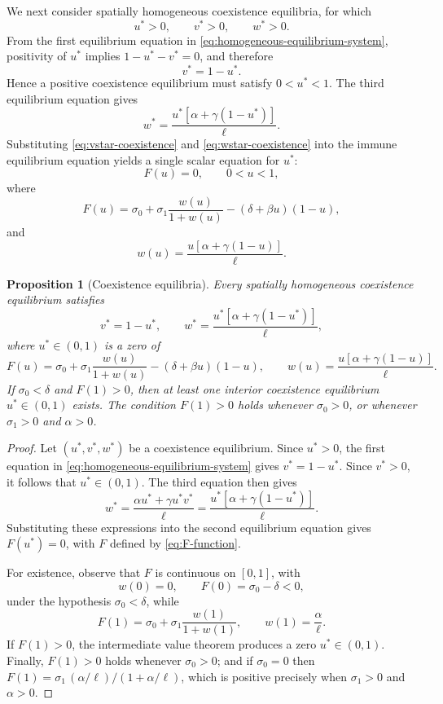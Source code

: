 \documentclass[a4paper,fleqn,longmktitle]{cas-sc}
\theoremstyle{plain}
\newtheorem{proposition}[theorem]{Proposition}
\theoremstyle{definition}
\numberwithin{equation}{section}
\begin{document}
We next consider spatially homogeneous coexistence equilibria, for which
\[
u^*>0,\qquad v^*>0,\qquad w^*>0.
\]
From the first equilibrium equation in
\eqref{eq:homogeneous-equilibrium-system}, positivity of $u^*$ implies
$1-u^*-v^*=0$,
and therefore
\begin{equation}\label{eq:vstar-coexistence}
v^*=1-u^*.
\end{equation}
Hence a positive coexistence equilibrium must satisfy $0<u^*<1$.
The third equilibrium equation gives
\begin{equation}\label{eq:wstar-coexistence}
w^*
=
\frac{u^*[\alpha+\gamma(1-u^*)]}{\ell}.
\end{equation}
Substituting \eqref{eq:vstar-coexistence} and
\eqref{eq:wstar-coexistence} into the immune equilibrium equation yields a
single scalar equation for $u^*$:
\begin{equation}\label{eq:F-definition}
F(u)=0,\qquad 0<u<1,
\end{equation}
where
\begin{equation}\label{eq:F-function}
F(u)
=
\sigma_0+\sigma_1\frac{w(u)}{1+w(u)}
-(\delta+\beta u)(1-u),
\end{equation}
and
\begin{equation}\label{eq:w-of-u}
w(u)
=
\frac{u[\alpha+\gamma(1-u)]}{\ell}.
\end{equation}

\begin{proposition}[Coexistence equilibria]
\label{prop:coexistence-equilibria}
Every spatially homogeneous coexistence equilibrium satisfies
\[
v^*=1-u^*,\qquad
w^*=\frac{u^*[\alpha+\gamma(1-u^*)]}{\ell},
\]
where $u^*\in(0,1)$ is a zero of
\[
F(u)
=
\sigma_0+\sigma_1\frac{w(u)}{1+w(u)}
-(\delta+\beta u)(1-u),
\qquad
w(u)=\frac{u[\alpha+\gamma(1-u)]}{\ell}.
\]
If $\sigma_0<\delta$ and $F(1)>0$,
then at least one interior coexistence equilibrium $u^*\in(0,1)$ exists. The
condition $F(1)>0$ holds whenever $\sigma_0>0$, or whenever $\sigma_1>0$ and
$\alpha>0$.
\end{proposition}

\begin{proof}
Let $(u^*,v^*,w^*)$ be a coexistence equilibrium. Since $u^*>0$, the first
equation in \eqref{eq:homogeneous-equilibrium-system} gives
$v^*=1-u^*$. Since $v^*>0$, it follows that $u^*\in(0,1)$. The third equation
then gives
\[
w^*=\frac{\alpha u^*+\gamma u^*v^*}{\ell}
=
\frac{u^*[\alpha+\gamma(1-u^*)]}{\ell}.
\]
Substituting these expressions into the second equilibrium equation gives
$F(u^*)=0$, with $F$ defined by \eqref{eq:F-function}.

For existence, observe that $F$ is continuous on $[0,1]$, with
\[
w(0)=0,\qquad
F(0)=\sigma_0-\delta<0,
\]
under the hypothesis $\sigma_0<\delta$, while
\[
F(1)
=
\sigma_0+\sigma_1\frac{w(1)}{1+w(1)},
\qquad
w(1)=\frac{\alpha}{\ell}.
\]
If $F(1)>0$, the intermediate value theorem produces a zero $u^*\in(0,1)$.
Finally, $F(1)>0$ holds whenever $\sigma_0>0$; and if $\sigma_0=0$ then
$F(1)=\sigma_1\,(\alpha/\ell)/(1+\alpha/\ell)$, which is positive precisely when
$\sigma_1>0$ and $\alpha>0$.
\end{proof}
\end{document}
